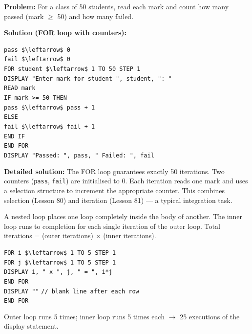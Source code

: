 \documentclass[11pt]{article}
\newcommand{\cle}[1]{{\popxbold\color{popdark}#1}}
\newcounter{popsec}
\newcounter{popsub}
\newcommand{\courssub}[1]{%
  \stepcounter{popsub}%
  \par\vspace{9pt}\noindent{\popxbold\fontsize{11.5}{13}\selectfont\color{popink}{\color{poporange}\thepopsec.\thepopsub}\hspace{6pt}#1}\par\nopagebreak\vspace{4pt}
}
\begin{document}
\begin{exoresolu}
\textbf{Problem:} For a class of 50 students, read each mark and count how many passed (mark $\geq$ 50) and how many failed.

\textbf{Solution (FOR loop with counters):}
\begin{flushleft}
\texttt{pass \$\textbackslash{}leftarrow\$ 0}\\
\texttt{fail \$\textbackslash{}leftarrow\$ 0}\\
\texttt{FOR student \$\textbackslash{}leftarrow\$ 1 TO 50 STEP 1}\\
\quad\texttt{DISPLAY "Enter mark for student ", student, ": "}\\
\quad\texttt{READ mark}\\
\quad\texttt{IF mark >= 50 THEN}\\
\quad\quad\texttt{pass \$\textbackslash{}leftarrow\$ pass + 1}\\
\quad\texttt{ELSE}\\
\quad\quad\texttt{fail \$\textbackslash{}leftarrow\$ fail + 1}\\
\quad\texttt{END IF}\\
\texttt{END FOR}\\
\texttt{DISPLAY "Passed: ", pass, " Failed: ", fail}
\end{flushleft}
\tcblower
\textbf{Detailed solution:} The FOR loop guarantees exactly 50 iterations. Two counters (\texttt{pass}, \texttt{fail}) are initialised to 0. Each iteration reads one mark and uses a selection structure to increment the appropriate counter. This combines selection (Lesson 80) and iteration (Lesson 81) — a typical integration task.
\end{exoresolu}

\courssub{Nested loops}

A \cle{nested loop} places one loop completely inside the body of another. The inner loop runs to completion for each single iteration of the outer loop. Total iterations = (outer iterations) $\times$ (inner iterations).

\begin{exemplebox}
\begin{flushleft}
\texttt{FOR i \$\textbackslash{}leftarrow\$ 1 TO 5 STEP 1}\\
\quad\texttt{FOR j \$\textbackslash{}leftarrow\$ 1 TO 5 STEP 1}\\
\quad\quad\texttt{DISPLAY i, " x ", j, " = ", i*j}\\
\quad\texttt{END FOR}\\
\quad\texttt{DISPLAY ""} \quad \texttt{// blank line after each row}\\
\texttt{END FOR}
\end{flushleft}
Outer loop runs 5 times; inner loop runs 5 times each $\rightarrow$ 25 executions of the display statement.
\end{exemplebox}
\end{document}
